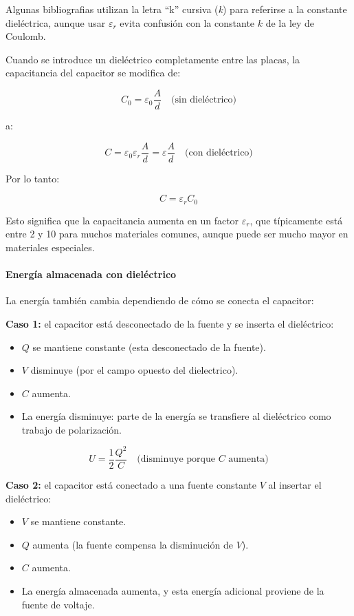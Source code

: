 Algunas bibliografias utilizan la letra ``k'' cursiva (\textit{k}) para referirse a la constante dieléctrica, aunque usar \( \varepsilon_r \) evita confusión con la constante \(k\) d\textsl{}e la ley de Coulomb.

Cuando se introduce un dieléctrico completamente entre las placas, la capacitancia del capacitor se modifica de:

\[
C_0 = \varepsilon_0 \frac{A}{d}
\quad \text{(sin dieléctrico)}
\]

a:

\[
C = \varepsilon_0 \varepsilon_r \frac{A}{d} = \varepsilon \frac{A}{d}
\quad \text{(con dieléctrico)}
\]

Por lo tanto:

\begin{equation}
    \boxed{C = \varepsilon_r C_0}
    \label{eq:capacitance_dielectric}
\end{equation}

Esto significa que la capacitancia aumenta en un factor \( \varepsilon_r \), que típicamente está entre 2 y 10 para muchos materiales comunes, aunque puede ser mucho mayor en materiales especiales.

\paragraph{Energía almacenada con dieléctrico}

La energía también cambia dependiendo de cómo se conecta el capacitor:

\textbf{Caso 1: } el capacitor está desconectado de la fuente y se inserta el dieléctrico:
\begin{itemize}
    \item \( Q \) se mantiene constante (esta desconectado de la fuente).
    \item \( V \) disminuye (por el campo opuesto del dielectrico).
    \item \( C \) aumenta.
    \item La energía disminuye: parte de la energía se transfiere al dieléctrico como trabajo de polarización.
\end{itemize}

\[
U = \frac{1}{2} \frac{Q^2}{C} \quad \text{(disminuye porque } C \text{ aumenta)}
\]

\textbf{Caso 2: } el capacitor está conectado a una fuente constante \( V \) al insertar el dieléctrico:
\begin{itemize}
    \item \( V \) se mantiene constante.
    \item \( Q \) aumenta (la fuente compensa la disminución de \( V \)).
    \item \( C \) aumenta.
    \item La energía almacenada aumenta, y esta energía adicional proviene de la fuente de voltaje.
\end{itemize}

